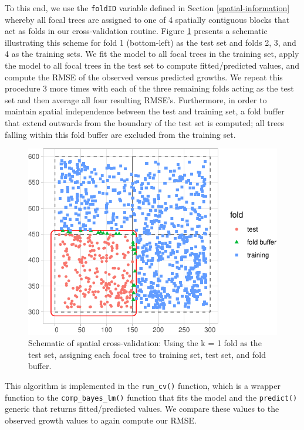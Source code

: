 \documentclass[12pt]{article}
\begin{document}
To this end, we use the \texttt{foldID} variable defined in Section
\ref{spatial-information} whereby all focal trees are assigned to one of
4 spatially contiguous blocks that act as folds in our cross-validation
routine. Figure \ref{fig:scbi-spatial-cross-validation-schematic}
presents a schematic illustrating this scheme for fold 1 (bottom-left)
as the test set and folds 2, 3, and 4 as the training sets. We fit the
model to all focal trees in the training set, apply the model to all
focal trees in the test set to compute fitted/predicted values, and
compute the RMSE of the observed versus predicted growths. We repeat
this procedure 3 more times with each of the three remaining folds
acting as the test set and then average all four resulting RMSE's.
Furthermore, in order to maintain spatial independence between the test
and training set, a fold buffer that extend outwards from the boundary
of the test set is computed; all trees falling within this fold buffer
are excluded from the training set.

\begin{figure}

{\centering \includegraphics[width=0.66\linewidth]{Figures/scbi-spatial-cross-validation-schematic-1} 

}

\caption{Schematic of spatial cross-validation: Using the k = 1 fold as the test set, assigning each focal tree to training set, test set, and fold buffer.}\label{fig:scbi-spatial-cross-validation-schematic}
\end{figure}

This algorithm is implemented in the \texttt{run\_cv()} function, which
is a wrapper function to the \texttt{comp\_bayes\_lm()} function that
fits the model and the \texttt{predict()} generic that returns
fitted/predicted values. We compare these values to the observed growth
values to again compute our RMSE.
\end{document}
